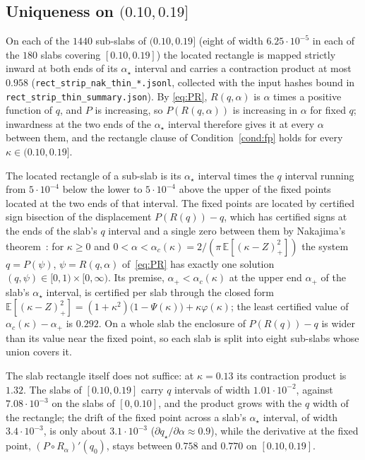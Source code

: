 \documentclass[11pt]{article}
\theoremstyle{remark}
\newcommand{\E}{\mathbb{E}}
\begin{document}
\subsection{\texorpdfstring{Uniqueness on $(0.10,0.19]$}{Uniqueness on (0.10, 0.19]}}\label{sec:nak}

On each of the $1440$ sub-slabs of $(0.10,0.19]$ (eight of width
$6.25\cdot10^{-5}$ in each of the $180$ slabs covering $[0.10,0.19]$)
the located rectangle is mapped strictly inward at both ends of its
$\alpha_\star$ interval and carries a contraction product at most $0.958$
(\texttt{rect\_strip\_nak\_thin\_*.jsonl}, collected with the input
hashes bound in \texttt{rect\_strip\_thin\_summary.json}).  By
\eqref{eq:PR}, $R(q,\alpha)$ is $\alpha$ times a positive function of
$q$, and $P$ is increasing, so $P(R(q,\alpha))$ is increasing in
$\alpha$ for fixed $q$; inwardness at the two ends of the $\alpha_\star$
interval therefore gives it at every $\alpha$ between them, and the
rectangle clause of Condition~\ref{cond:fp} holds for every
$\kappa\in(0.10,0.19]$.

The located rectangle of a sub-slab is its $\alpha_\star$ interval times the
$q$ interval running from $5\cdot10^{-4}$ below the lower to
$5\cdot10^{-4}$ above the upper of the fixed points located at the two
ends of that interval.  The fixed points are located by certified sign
bisection of the displacement $P(R(q))-q$, which has certified signs
at the ends of the slab's $q$ interval and a single zero between them
by Nakajima's theorem~\cite[Theorem~1]{nakajima2025}: for $\kappa\ge0$
and $0<\alpha<\alpha_c(\kappa)=2/(\pi\,\E[(\kappa-Z)_+^2])$ the system
$q=P(\psi)$, $\psi=R(q,\alpha)$ of~\eqref{eq:PR} has exactly one
solution $(q,\psi)\in[0,1)\times[0,\infty)$.  Its premise, $\alpha_+<\alpha_c(\kappa)$ at the upper end $\alpha_+$ of the
slab's $\alpha_\star$ interval, is certified per slab through the closed form
$\E[(\kappa-Z)_+^2]=(1+\kappa^2)\bigl(1-\Psi(\kappa)\bigr)
+\kappa\varphi(\kappa)$; the least certified value of
$\alpha_c(\kappa)-\alpha_+$ is $0.292$.  On a whole slab the enclosure of $P(R(q))-q$ is wider than its value
near the fixed point, so each slab is split into eight sub-slabs whose
union covers it.

The slab rectangle itself does not suffice: at $\kappa=0.13$ its
contraction product is $1.32$.  The slabs of $[0.10,0.19]$ carry $q$
intervals of width $1.01\cdot10^{-2}$, against $7.08\cdot10^{-3}$ on
the slabs of $[0,0.10]$, and the product grows with the $q$ width of
the rectangle; the drift of the fixed point across a slab's
$\alpha_\star$ interval, of width $3.4\cdot10^{-3}$, is only about
$3.1\cdot10^{-3}$ ($\partial q_\star/\partial\alpha\approx0.9$), while the derivative at
the fixed point, $(P\circ R_\alpha)'(q_0)$, stays between $0.758$ and
$0.770$ on $[0.10,0.19]$.
\end{document}
